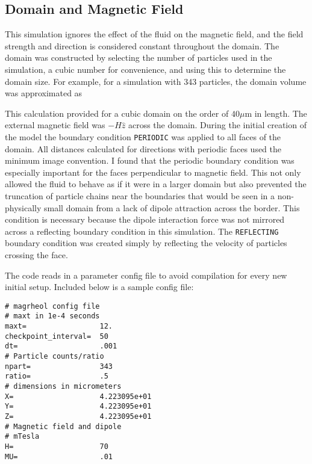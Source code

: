 \begin{multicols*}{2}
\subsection*{Domain and Magnetic Field}

This simulation ignores the effect of the fluid on the magnetic field,
and the field strength and direction is considered constant throughout
the domain. The domain was constructed by selecting the number of
particles used in the simulation, a cubic number for convenience, and
using this to determine the domain size. For example, for a simulation
with 343 particles, the domain volume was approximated as


This calculation provided for a cubic domain on the order of $40 \mu$m
in length.  The external magnetic field was $- H\hat z$ across the
domain. During the initial creation of the model the boundary
condition {\tt PERIODIC} was applied to all faces of the domain.  All
distances calculated for directions with periodic faces used the
minimum image convention. I found that the periodic boundary condition
was especially important for the faces perpendicular to magnetic
field.  This not only allowed the fluid to behave as if it were in a
larger domain but also prevented the truncation of particle chains
near the boundaries that would be seen in a non-physically small
domain from a lack of dipole attraction across the border. This
condition is necessary because the dipole interaction force was not
mirrored across a reflecting boundary condition in this
simulation. The {\tt REFLECTING} boundary condition was created simply
by reflecting the velocity of particles crossing the face. 

The code reads in a parameter config file to avoid compilation for every new
initial setup. Included below is a sample config file:
\begin{verbatim}
# magrheol config file
# maxt in 1e-4 seconds
maxt=                 12.
checkpoint_interval=  50
dt=                   .001
# Particle counts/ratio
npart=                343
ratio=                .5
# dimensions in micrometers
X=                    4.223095e+01
Y=                    4.223095e+01
Z=                    4.223095e+01
# Magnetic field and dipole
# mTesla
H=                    70
MU=                   .01
\end{verbatim}



\end{multicols*}
